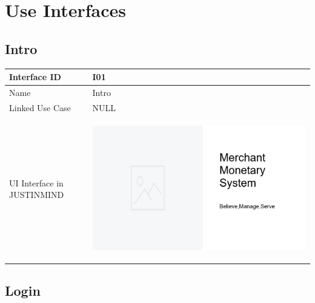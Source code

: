 \documentclass[12pt,a4paper]{report}
\begin{document}
\chapter {Use Interfaces}
\section{Intro}

\begin{tabular}{ | m{3cm} | m{12cm}| } \hline

Interface ID & I01  \\\hline

Name  	      & Intro  \\ \hline

Linked Use Case & NULL \\ \hline

UI Interface in JUSTINMIND & \begin{center} \includegraphics[scale=0.3]{./UIs for Latex Reports/UI-001 Intro@1x.png}\end{center}  \\ \hline
\end{tabular} 
\section{Login}
\end{document}

